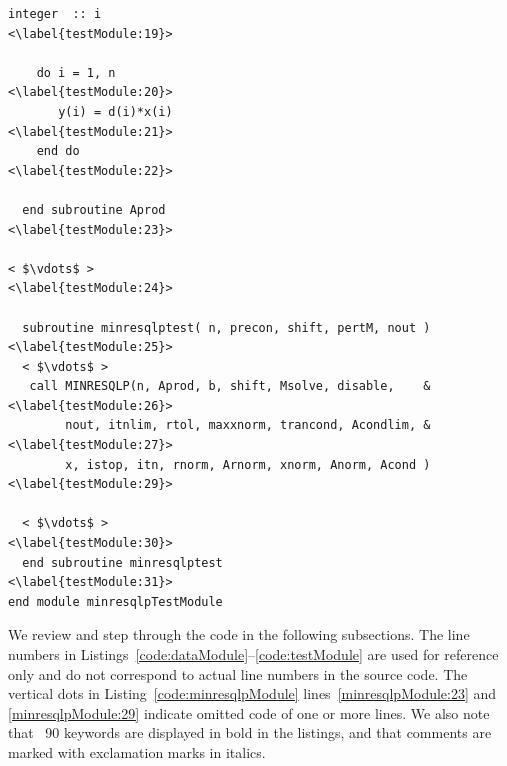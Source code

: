 \documentclass{doc_acmtrans2m}
\begin{document}
\begin{lstlisting}[frame=TB,float,caption=Partial code listing of
                   minresqlpTestModule.,label=code:testModule,texcl]
    integer  :: i                                              <\label{testModule:19}>

    do i = 1, n                                                <\label{testModule:20}>
       y(i) = d(i)*x(i)                                        <\label{testModule:21}>
    end do                                                     <\label{testModule:22}>

  end subroutine Aprod                                         <\label{testModule:23}>

< $\vdots$ >                                                   <\label{testModule:24}>

  subroutine minresqlptest( n, precon, shift, pertM, nout )    <\label{testModule:25}>
  < $\vdots$ >
   call MINRESQLP(n, Aprod, b, shift, Msolve, disable,    &<\label{testModule:26}>
        nout, itnlim, rtol, maxxnorm, trancond, Acondlim, &<\label{testModule:27}>
        x, istop, itn, rnorm, Arnorm, xnorm, Anorm, Acond )<\label{testModule:29}>
                
  < $\vdots$ >                                                 <\label{testModule:30}>
  end subroutine minresqlptest                                 <\label{testModule:31}>
end module minresqlpTestModule
\end{lstlisting}


We review and step through the code in the following subsections. The
line numbers in Listings~\ref{code:dataModule}--\ref{code:testModule}
are used for reference only and do not correspond to actual line
numbers in the source code.  The vertical dots in
Listing~\ref{code:minresqlpModule} lines~\ref{minresqlpModule:23} and
\ref{minresqlpModule:29} indicate omitted code of one or more lines.
We also note that \FORTRAN~90 keywords are displayed in bold in the
listings, and that comments are marked with exclamation marks in
italics.
\end{document}
